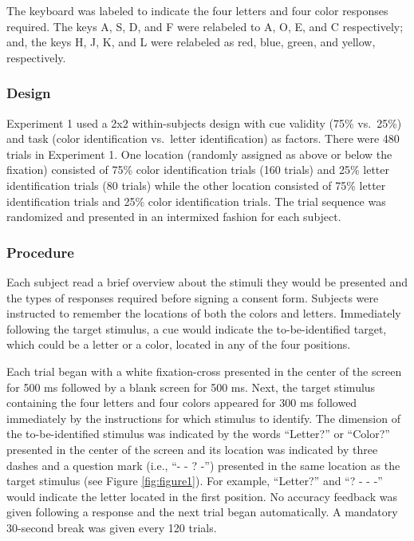 \documentclass[english,,man,floatsintext]{apa6}
\begin{document}
The keyboard was labeled to indicate the four letters and four color
responses required. The keys A, S, D, and F were relabeled to A, O, E,
and C respectively; and, the keys H, J, K, and L were relabeled as red,
blue, green, and yellow, respectively.

\subsubsection{Design}\label{design}

Experiment 1 used a 2x2 within-subjects design with cue validity (75\%
vs.~25\%) and task (color identification vs.~letter identification) as
factors. There were 480 trials in Experiment 1. One location (randomly
assigned as above or below the fixation) consisted of 75\% color
identification trials (160 trials) and 25\% letter identification trials
(80 trials) while the other location consisted of 75\% letter
identification trials and 25\% color identification trials. The trial
sequence was randomized and presented in an intermixed fashion for each
subject.

\subsubsection{Procedure}\label{procedure}

Each subject read a brief overview about the stimuli they would be
presented and the types of responses required before signing a consent
form. Subjects were instructed to remember the locations of both the
colors and letters. Immediately following the target stimulus, a cue
would indicate the to-be-identified target, which could be a letter or a
color, located in any of the four positions.

Each trial began with a white fixation-cross presented in the center of
the screen for 500 ms followed by a blank screen for 500 ms. Next, the
target stimulus containing the four letters and four colors appeared for
300 ms followed immediately by the instructions for which stimulus to
identify. The dimension of the to-be-identified stimulus was indicated
by the words \enquote{Letter?} or \enquote{Color?} presented in the
center of the screen and its location was indicated by three dashes and
a question mark (i.e., \enquote{- - ? -}) presented in the same location
as the target stimulus (see Figure \ref{fig:figure1}). For example,
\enquote{Letter?} and \enquote{? - - -} would indicate the letter
located in the first position. No accuracy feedback was given following
a response and the next trial began automatically. A mandatory 30-second
break was given every 120 trials.
\end{document}
